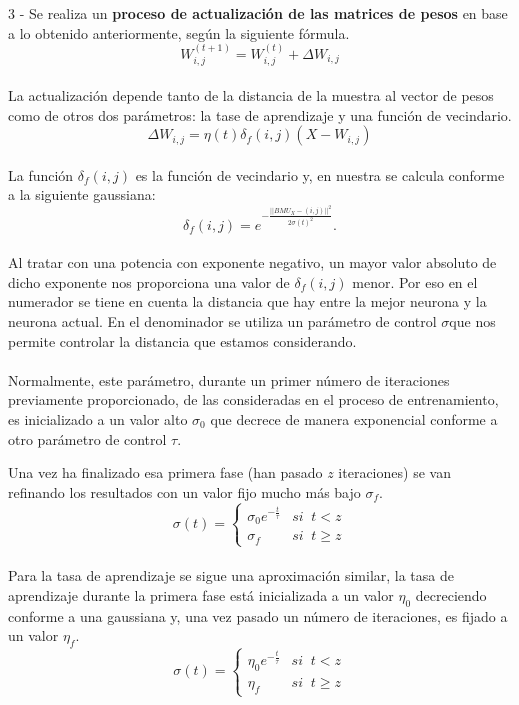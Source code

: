 3 - Se realiza un \textbf{proceso de actualización de las matrices de pesos} en base a lo obtenido anteriormente, según la siguiente fórmula.\\
$$ W_{i, j}^{(t+1)} = W_{i, j}^{(t)} + \Delta {W_{i,j}} $$\\

La actualización depende tanto de la distancia de la muestra al vector de pesos como de otros dos parámetros: la tase de aprendizaje y una función de vecindario.\\

$$\Delta W_{i,j} = \eta(t)\delta_f(i,j)(X-W_{i,j})$$\\

La función $\delta_f(i,j)$ es la función de vecindario y, en nuestra se calcula conforme a la siguiente gaussiana:\\

$$\delta_f(i,j) = e ^{-\frac{||BMU_X-(i,j)||^2}{2\sigma(t)^2}}. $$\\

Al tratar con una potencia con exponente negativo, un mayor valor absoluto de dicho exponente nos proporciona una valor de $\delta_f(i,j)$ menor. Por eso en el numerador se tiene en cuenta la distancia que hay entre la mejor neurona y la neurona actual. En el denominador se utiliza un parámetro de control $\sigma$que nos permite controlar la distancia que estamos considerando.\\\\

Normalmente, este parámetro, durante un primer número de iteraciones previamente proporcionado, de las consideradas en el proceso de entrenamiento, es inicializado a un valor alto $\sigma_0$ que decrece de manera exponencial conforme a otro parámetro de control $\tau$.

Una vez ha finalizado esa primera fase (han pasado $z$ iteraciones) se van refinando los resultados con un valor fijo mucho más bajo $\sigma_f$.\\


$$\sigma(t) = \left\{
\begin{array}{ll}
\sigma_0e^{-\frac{t}{\tau}} & si \;\;t < z\\
\sigma_f & si  \;\; t\geq z
\end{array}
\right.
$$\\

Para la tasa de aprendizaje se sigue una aproximación similar, la tasa de aprendizaje durante la primera fase está inicializada a un valor $\eta_0$ decreciendo conforme a una gaussiana y, una vez pasado un número de iteraciones, es fijado a un valor $\eta_f$. \\
$$\sigma(t) = \left\{
\begin{array}{ll}
\eta_0e^{-\frac{t}{\tau}} & si \;\;t < z\\
\eta_f & si  \;\; t\geq z
\end{array}
\right.$$\\

